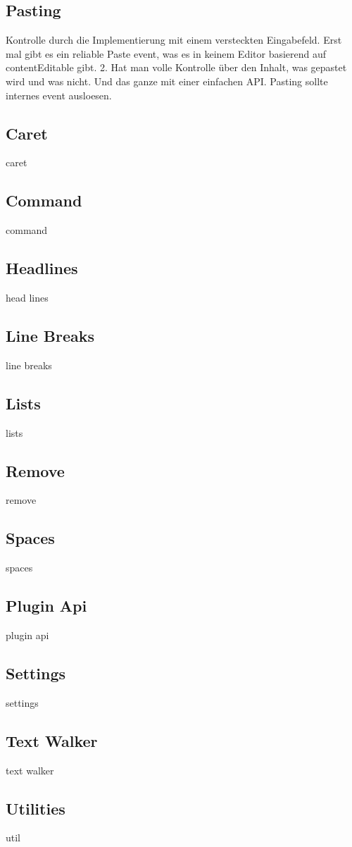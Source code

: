 \subsection{Pasting} Kontrolle durch die Implementierung mit einem versteckten Eingabefeld. Erst mal gibt es ein reliable Paste event, was es in keinem Editor basierend auf contentEditable gibt. 2. Hat man volle Kontrolle über den Inhalt, was gepastet wird und was nicht. Und das ganze mit einer einfachen API. Pasting sollte internes event ausloesen.


\subsection{Caret}
caret
\subsection{Command}
command
\subsection{Headlines}
head lines
\subsection{Line Breaks}
line breaks
\subsection{Lists}
lists
\subsection{Remove}
remove
\subsection{Spaces}
spaces

\subsection{Plugin Api}
plugin api
\subsection{Settings}
settings
\subsection{Text Walker}
text walker
\subsection{Utilities}
util

